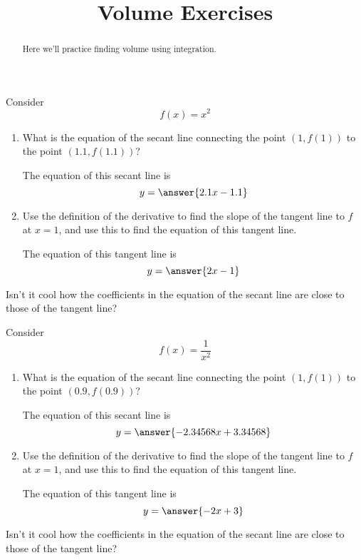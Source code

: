 \documentclass[handout]{ximera}
\title[Exercises:]{Volume Exercises}
\begin{document}
\begin{abstract}
  Here we'll practice finding volume using integration.
\end{abstract}
\maketitle

\begin{exercise}
Consider 
\[
f(x) = x^2
\]

\begin{enumerate}
\item What is the equation of the secant line connecting the point $(1,f(1))$ to the point $(1.1,f(1.1))$? 
\begin{prompt} 
The equation of this secant line is
$$ y = \answer{ 2.1x - 1.1}$$ 
\end{prompt}

\item  Use the definition of the derivative to find the slope of the tangent line to $f$ at $x=1$, and use this to find the equation of this tangent line.

\begin{prompt} 
The equation of this tangent line is
$$ y = \answer{ 2x - 1}$$ 
\end{prompt}

\end{enumerate}

Isn't it cool how the coefficients in the equation of the secant line are close to those of the tangent line?
\end{exercise}

\begin{exercise}
Consider 
\[
f(x) = \frac{1}{x^2}
\]

\begin{enumerate}
\item What is the equation of the secant line connecting the point $(1,f(1))$ to the point $(0.9,f(0.9))$? 
\begin{prompt} 
The equation of this secant line is
$$ y = \answer{ -2.34568x+ 3.34568}$$ 
\end{prompt}

\item  Use the definition of the derivative to find the slope of the tangent line to $f$ at $x=1$, and use this to find the equation of this tangent line.

\begin{prompt} 
The equation of this tangent line is
$$ y = \answer{ -2x + 3}$$ 
\end{prompt}

\end{enumerate}

Isn't it cool how the coefficients in the equation of the secant line are close to those of the tangent line?
\end{exercise}
\end{document}
